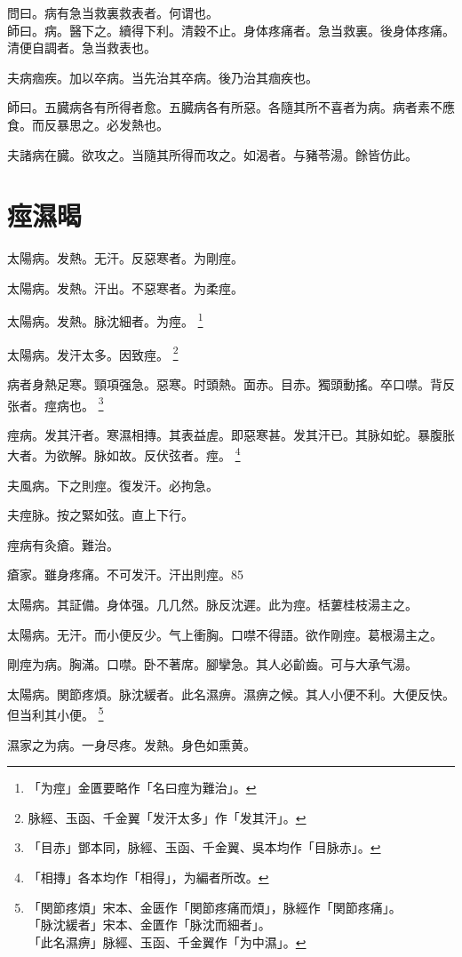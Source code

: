 問曰。病有急当救裏救表者。何谓也。\\
師曰。病。醫下之。續得下利。清穀不止。身体疼痛者。急当救裏。後身体疼痛。清便自調者。急当救表也。

夫病痼疾。加以卒病。当先治其卒病。後乃治其痼疾也。

師曰。五臓病各有所得者愈。五臓病各有所惡。各隨其所不喜者为病。病者素不應食。而反暴思之。必发熱也。

夫諸病在臓。欲攻之。当隨其所得而攻之。如渴者。与豬苓湯。餘皆仿此。

\chapter{痙濕暍}

太陽病。发熱。无汗。反惡寒者。为剛痙。

太陽病。发熱。汗出。不惡寒者。为柔痙。

太陽病。发熱。脉沈細者。为痙。
	\footnote{「为痙」金匱要略作「名曰痙为難治」。}

太陽病。发汗太多。因致痙。
	\footnote{脉經、玉函、千金翼「发汗太多」作「发其汗」。}

病者身熱足寒。頸項强急。惡寒。时頭熱。面赤。目赤。獨頭動搖。卒口噤。背反张者。痙病也。
	\footnote{「目赤」鄧本同，脉經、玉函、千金翼、吳本均作「目脉赤」。}

痙病。发其汗者。寒濕相摶。其表益虗。即惡寒甚。发其汗已。其脉如蛇。暴腹胀大者。为欲解。脉如故。反伏弦者。痙。
	\footnote{「相摶」各本均作「相得」，为編者所改。}

夫風病。下之則痙。復发汗。必拘急。

夫痙脉。按之緊如弦。直上下行。

痙病有灸瘡。難治。

瘡家。雖身疼痛。不可发汗。汗出則痙。85

太陽病。其証備。身体强。几几然。脉反沈遲。此为痙。栝蔞桂枝湯主之。

太陽病。无汗。而小便反少。气上衝胸。口噤不得語。欲作剛痙。葛根湯主之。

{\khaaitp 剛}痙为病。胸滿。口噤。卧不著席。腳攣急。其人必齘齒。可与大承气湯。

太陽病。関節疼煩。脉沈緩者。此名濕痹。濕痹之候。其人小便不利。大便反快。但当利其小便。
	\footnote{「関節疼煩」宋本、金匮作「関節疼痛而煩」，脉經作「関節疼痛」。\\「脉沈緩者」宋本、金匱作「脉沈而細者」。\\「此名濕痹」脉經、玉函、千金翼作「为中濕」。}

濕家之为病。一身尽疼。发熱。身色如熏黄。

